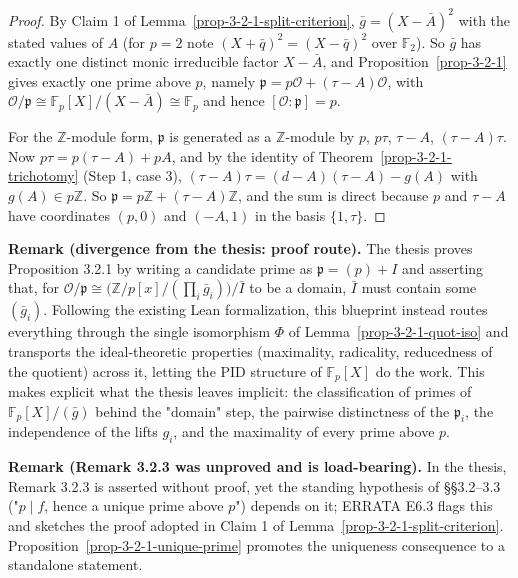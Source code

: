 \begin{proof}
  By Claim 1 of Lemma~\ref{prop-3-2-1-split-criterion}, $\bar g =
  (X - \bar A)^2$ with the stated values of $A$ (for $p = 2$ note
  $(X + \bar q)^2 = (X - \bar q)^2$ over $\mathbb{F}_2$). So $\bar g$ has
  exactly one distinct monic irreducible factor $X - \bar A$, and
  Proposition~\ref{prop-3-2-1} gives exactly one prime above $p$, namely
  $\mathfrak{p} = p\mathcal{O} + (\tau - A)\mathcal{O}$, with
  $\mathcal{O}/\mathfrak{p} \cong \mathbb{F}_p[X]/(X - \bar A) \cong
  \mathbb{F}_p$ and hence $[\mathcal{O} : \mathfrak{p}] = p$.

  For the $\mathbb{Z}$-module form, $\mathfrak{p}$ is generated as a
  $\mathbb{Z}$-module by $p$, $p\tau$, $\tau - A$, $(\tau - A)\tau$. Now
  $p\tau = p(\tau - A) + pA$, and by the identity of
  Theorem~\ref{prop-3-2-1-trichotomy} (Step 1, case 3),
  $(\tau - A)\tau = (d - A)(\tau - A) - g(A)$ with $g(A) \in p\mathbb{Z}$.
  So $\mathfrak{p} = p\mathbb{Z} + (\tau - A)\mathbb{Z}$, and the sum is
  direct because $p$ and $\tau - A$ have coordinates $(p, 0)$ and $(-A, 1)$
  in the basis $\{1, \tau\}$.
\end{proof}

\bigskip

\noindent\textbf{Remark (divergence from the thesis: proof route).} The
thesis proves Proposition 3.2.1 by writing a candidate prime as
$\mathfrak{p} = (p) + I$ and asserting that, for $\mathcal{O}/\mathfrak{p}
\cong \big(\mathbb{Z}/p[x]/(\prod_i \bar g_i)\big)/\bar I$ to be a domain,
$\bar I$ must contain some $(\bar g_i)$. Following the existing Lean
formalization, this blueprint instead routes everything through the single
isomorphism $\Phi$ of Lemma~\ref{prop-3-2-1-quot-iso} and transports the
ideal-theoretic properties (maximality, radicality, reducedness of the
quotient) across it, letting the PID structure of $\mathbb{F}_p[X]$ do the
work. This makes explicit what the thesis leaves implicit: the
classification of primes of $\mathbb{F}_p[X]/(\bar g)$ behind the "domain"
step, the pairwise distinctness of the $\mathfrak{p}_i$, the independence of
the lifts $g_i$, and the maximality of every prime above $p$.

\medskip

\noindent\textbf{Remark (Remark 3.2.3 was unproved and is load-bearing).}
In the thesis, Remark 3.2.3 is asserted without proof, yet the standing
hypothesis of \S\S3.2--3.3 ("$p \mid f$, hence a unique prime above $p$")
depends on it; ERRATA E6.3 flags this and sketches the proof adopted in
Claim 1 of Lemma~\ref{prop-3-2-1-split-criterion}.
Proposition~\ref{prop-3-2-1-unique-prime} promotes the uniqueness
consequence to a standalone statement.

